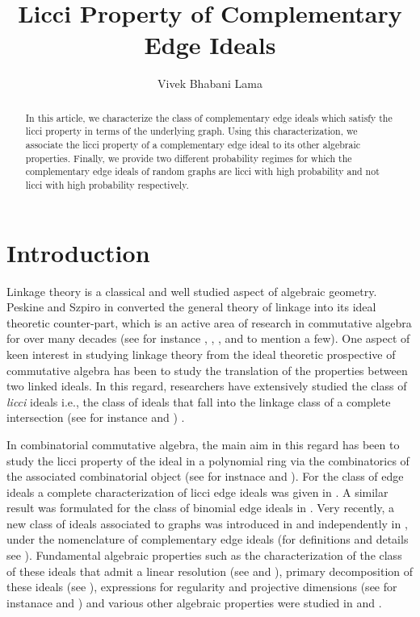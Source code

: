 \documentclass[oneside, 12pt]{amsart} \topmargin      -10mm \textwidth      160 true mm
\title[Licci Complementary Edge Ideals]{Licci Property of Complementary Edge Ideals}
\author{Vivek Bhabani Lama}
\date{}
\theoremstyle{definition}
\numberwithin{equation}{section}
\begin{document}
	
	\begin{abstract}
		In this article, we characterize the class of complementary edge ideals which satisfy the licci property in terms of the underlying graph. Using this characterization, we associate the licci property of a complementary edge ideal to its other algebraic properties. Finally, we provide two different probability regimes for which the complementary edge ideals of random graphs are licci with high  probability and not licci with high probability respectively. 
	\end{abstract}
	
	\maketitle
  
\section{Introduction}
 Linkage theory is a classical and well studied aspect of algebraic geometry. Peskine and Szpiro in \cite{peskine1974liaison} converted the general theory of linkage into its ideal theoretic counter-part, which is an active area of research in commutative algebra for over many decades (see for instance \cite{dibaei2015linkage}, \cite{MR4658822}, \cite{huneke1987structure},   \cite{Liason} and \cite{klein2021geometric} to mention a few). One aspect of keen interest in studying linkage theory from the ideal theoretic prospective of commutative algebra has been to study the translation of the properties between two linked ideals. In this regard, researchers have extensively studied the class of \textit{licci} ideals i.e., the class of ideals that fall into the linkage class of a complete intersection (see for instance \cite{RIareLICCI} and \cite{HL}) .    

In combinatorial commutative algebra, the main aim in this regard has been to study the licci property of the ideal in a polynomial ring via the combinatorics of the associated combinatorial object (see for instnace \cite{4D} and \cite{LLSR}). For the class of edge ideals a complete characterization of licci edge ideals was given in \cite[Theorem~3.7.]{LicciEdgeIdeals}. A similar result was formulated for the class of binomial edge ideals in \cite[Theorem~3.5.]{LicciBinom}. Very recently, a new class of ideals associated to graphs was introduced in \cite{hibi2025complementary} and independently in \cite{ficarra2025complementary}, under the nomenclature of complementary edge ideals (for definitions and details see ).  Fundamental algebraic properties such as the characterization of the class of these ideals that admit a linear resolution (see \cite[Theorem~4.5.]{ficarra2025complementary} and \cite[Theorem~2.2.]{hibi2025complementary}), primary decomposition of these ideals (see \cite[Theorem~2.1.]{ficarra2025complementary}), expressions for regularity and projective dimensions (see for instanace \cite[Theorem~4.1.]{ficarra2025complementary} and \cite[Theorem~4.2.]{hibi2025complementary}) and various other algebraic properties were studied in  \cite{ficarra2025complementary} and \cite{hibi2025complementary}.
\end{document}
